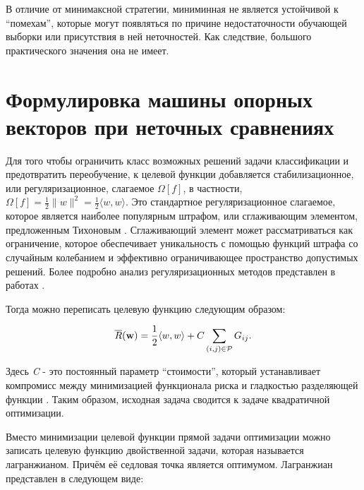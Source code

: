 \documentclass[12pt,a4paper,oneside]{article}
\begin{document}
\par
В отличие от минимаксной стратегии, миниминная не является устойчивой к ``помехам'', которые могут появляться по причине недостаточности обучающей выборки или присутствия в ней неточностей. 
Как следствие, большого практического значения она не имеет. 


\section{Формулировка машины опорных векторов при неточных сравнениях}
\label{sec:svm_by_imprecise_comparisons}

\par
Для того чтобы ограничить класс возможных решений задачи классификации и предотвратить переобучение, к целевой функции добавляется стабилизационное, или регуляризационное, слагаемое \(\Omega[f]\), в частности, \(\Omega[f] = \frac{1}{2}\|w\|^2 = \frac{1}{2} \langle w, w \rangle \). 
Это стандартное регуляризационное слагаемое, которое является наиболее популярным штрафом, или сглаживающим элементом, предложенным Тихоновым . 
Сглаживающий элемент может рассматриваться как ограничение, которое обеспечивает уникальность с помощью функций штрафа со случайным колебанием и эффективно ограничивающее пространство допустимых решений. 
Более подробно анализ регуляризационных методов представлен в работах  . 

\par
Тогда можно переписать целевую функцию следующим образом:

\[
\overline{R}(\mathbf{w}) = \frac{1}{2} \langle w, w \rangle + C \sum \limits_{(i, j) \in \mathcal{P}} G_{ij}. 
\]

\par
Здесь \emph{C} - это постоянный параметр ``стоимости'', который устанавливает компромисс между минимизацией функционала риска и гладкостью разделяющей функции . 
Таким образом, исходная задача сводится к задаче квадратичной оптимизации. 

\par
Вместо минимизации целевой функции прямой задачи оптимизации можно записать целевую функцию двойственной задачи, которая называется лагранжианом. 
Причём её седловая точка является оптимумом. 
Лагранжиан представлен в следующем виде:
\end{document}
